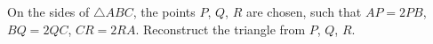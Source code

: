 On the sides of $\triangle ABC$, the points $P$, $Q$, $R$ are chosen, such that $AP = 2PB$, $BQ = 2QC$, $CR = 2RA$. Reconstruct the triangle from $P$, $Q$, $R$.
